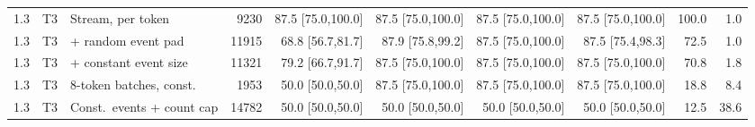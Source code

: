 \begin{table}[!ht]
\begin{tabular}{@{}lllrrrrrrr@{}}
1.3 & T3 & Stream, per token & 9230 & 87.5 [75.0,100.0] & 87.5 [75.0,100.0] & 87.5 [75.0,100.0] & 87.5 [75.0,100.0] & 100.0 & 1.0\\
1.3 & T3 & + random event pad & 11915 & 68.8 [56.7,81.7] & 87.9 [75.8,99.2] & 87.5 [75.0,100.0] & 87.5 [75.4,98.3] & 72.5 & 1.0\\
1.3 & T3 & + constant event size & 11321 & 79.2 [66.7,91.7] & 87.5 [75.0,100.0] & 87.5 [75.0,100.0] & 87.5 [75.0,100.0] & 70.8 & 1.8\\
1.3 & T3 & 8-token batches, const. & 1953 & 50.0 [50.0,50.0] & 87.5 [75.0,100.0] & 87.5 [75.0,100.0] & 87.5 [75.0,100.0] & 18.8 & 8.4\\
1.3 & T3 & Const.\ events + count cap & 14782 & 50.0 [50.0,50.0] & 50.0 [50.0,50.0] & 50.0 [50.0,50.0] & 50.0 [50.0,50.0] & 12.5 & 38.6\\
\bottomrule\end{tabular}\end{table}
